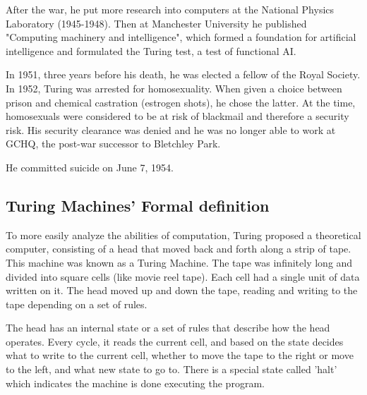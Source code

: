 \documentclass[11pt, letterpaper, twoside, openright]{book}
\begin{document}

After the war, he put more research into computers at the National Physics Laboratory (1945-1948). Then at Manchester University he published "Computing machinery and intelligence", which formed a foundation for artificial intelligence and formulated the Turing test, a test of functional AI. 


In 1951, three years before his death, he was elected a fellow of the Royal Society. In 1952, Turing was arrested for homosexuality. When given a choice between prison and chemical castration (estrogen shots), he chose the latter. At the time, homosexuals were considered to be at risk of blackmail and therefore a security risk. His security clearance was denied and he was no longer able to work at GCHQ, the post-war successor to Bletchley Park.

He committed suicide on June 7, 1954.

\subsection{Turing Machines' Formal definition}
To more easily analyze the abilities of computation, Turing proposed a theoretical computer, consisting of a head that moved back and forth along a strip of tape. This machine was known as a Turing Machine. The tape was infinitely long and divided into square cells (like movie reel tape). Each cell had a single unit of data written on it. The head moved up and down the tape, reading and writing to the tape depending on a set of rules.

The head has an internal state or a set of rules that describe how the head operates. Every cycle, it reads the current cell, and based on the state decides what to write to the current cell, whether to move the tape to the right or move to the left, and what new state to go to. There is a special state called 'halt' which indicates the machine is done executing the program.
\end{document}
